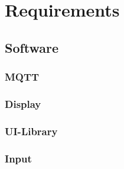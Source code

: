 \chapter{Requirements}
        \section{Software}
            \subsection{MQTT}
            \subsection{Display}
                \subsection{UI-Library}
                \subsection{Input}
        